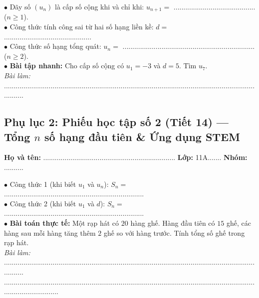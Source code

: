 \documentclass[12pt, a4paper]{article}
\begin{document}
\begin{pedabox}
    $\bullet$ Dãy số $(u_n)$ là cấp số cộng khi và chỉ khi: $u_{n+1} = $ .......................................... ($n \ge 1$).\\[0.3em]
    $\bullet$ Công thức tính công sai từ hai số hạng liền kề: $d = $ .............................................\\[0.3em]
    $\bullet$ Công thức số hạng tổng quát: $u_n = $ .................................................................... ($n \ge 2$).\\[0.3em]
    $\bullet$ \textbf{Bài tập nhanh:} Cho cấp số cộng có $u_1 = -3$ và $d = 5$. Tìm $u_7$.\\
    \textit{Bài làm:} ...........................................................................................................................................
\end{pedabox}


\subsection*{Phụ lục 2: Phiếu học tập số 2 (Tiết 14) --- Tổng $n$ số hạng đầu tiên \& Ứng dụng STEM}
\noindent\textbf{Họ và tên:} .................................................................... \textbf{Lớp:} 11A....... \textbf{Nhóm:} ..........


\begin{pedabox}
    $\bullet$ Công thức 1 (khi biết $u_1$ và $u_n$): $S_n = $ ........................................................................\\[0.3em]
    $\bullet$ Công thức 2 (khi biết $u_1$ và $d$): $S_n = $ ........................................................................\\[0.3em]
    $\bullet$ \textbf{Bài toán thực tế:} Một rạp hát có $20$ hàng ghế. Hàng đầu tiên có $15$ ghế, các hàng sau mỗi hàng tăng thêm $2$ ghế so với hàng trước. Tính tổng số ghế trong rạp hát.\\
    \textit{Bài làm:} ...........................................................................................................................................\\
    .............................................................................................................................................................
\end{pedabox}
\end{document}
